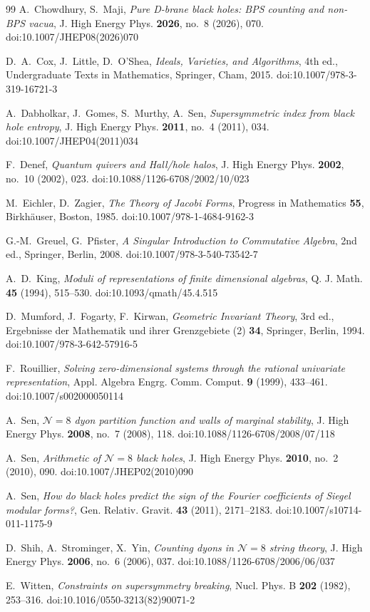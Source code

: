 \documentclass[11pt]{amsart}
\theoremstyle{definition}
\begin{document}
\begin{thebibliography}{99}
 A.~Chowdhury, S.~Maji, \emph{Pure D-brane black holes: BPS counting and non-BPS vacua}, J. High Energy Phys. \textbf{2026}, no.~8 (2026), 070. doi:10.1007/JHEP08(2026)070

 D.~A.~Cox, J.~Little, D.~O'Shea, \emph{Ideals, Varieties, and Algorithms}, 4th ed., Undergraduate Texts in Mathematics, Springer, Cham, 2015. doi:10.1007/978-3-319-16721-3

 A.~Dabholkar, J.~Gomes, S.~Murthy, A.~Sen, \emph{Supersymmetric index from black hole entropy}, J. High Energy Phys. \textbf{2011}, no.~4 (2011), 034. doi:10.1007/JHEP04(2011)034

 F.~Denef, \emph{Quantum quivers and Hall/hole halos}, J. High Energy Phys. \textbf{2002}, no.~10 (2002), 023. doi:10.1088/1126-6708/2002/10/023

 M.~Eichler, D.~Zagier, \emph{The Theory of Jacobi Forms}, Progress in Mathematics \textbf{55}, Birkh\"auser, Boston, 1985. doi:10.1007/978-1-4684-9162-3

 G.-M.~Greuel, G.~Pfister, \emph{A Singular Introduction to Commutative Algebra}, 2nd ed., Springer, Berlin, 2008. doi:10.1007/978-3-540-73542-7

 A.~D.~King, \emph{Moduli of representations of finite dimensional algebras}, Q. J. Math. \textbf{45} (1994), 515--530. doi:10.1093/qmath/45.4.515

 D.~Mumford, J.~Fogarty, F.~Kirwan, \emph{Geometric Invariant Theory}, 3rd ed., Ergebnisse der Mathematik und ihrer Grenzgebiete (2) \textbf{34}, Springer, Berlin, 1994. doi:10.1007/978-3-642-57916-5

 F.~Rouillier, \emph{Solving zero-dimensional systems through the rational univariate representation}, Appl. Algebra Engrg. Comm. Comput. \textbf{9} (1999), 433--461. doi:10.1007/s002000050114

 A.~Sen, \emph{$\mathcal N=8$ dyon partition function and walls of marginal stability}, J. High Energy Phys. \textbf{2008}, no.~7 (2008), 118. doi:10.1088/1126-6708/2008/07/118

 A.~Sen, \emph{Arithmetic of $\mathcal N=8$ black holes}, J. High Energy Phys. \textbf{2010}, no.~2 (2010), 090. doi:10.1007/JHEP02(2010)090

 A.~Sen, \emph{How do black holes predict the sign of the Fourier coefficients of Siegel modular forms?}, Gen. Relativ. Gravit. \textbf{43} (2011), 2171--2183. doi:10.1007/s10714-011-1175-9

 D.~Shih, A.~Strominger, X.~Yin, \emph{Counting dyons in $\mathcal N=8$ string theory}, J. High Energy Phys. \textbf{2006}, no.~6 (2006), 037. doi:10.1088/1126-6708/2006/06/037

 E.~Witten, \emph{Constraints on supersymmetry breaking}, Nucl. Phys. B \textbf{202} (1982), 253--316. doi:10.1016/0550-3213(82)90071-2

\end{thebibliography}
\end{document}
